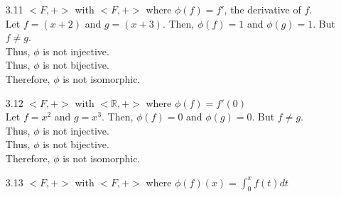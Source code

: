 \documentclass[12pt]{article}
\newcommand{\R}{\mathbb{R}}
\begin{document}
\begin{enumerate}
		\begin{enumerate}
			
			\item[3.11] $<F,+>$ with $<F,+>$ where $\phi(f) = f'$, the derivative of $f$.\\
				Let $ f=(x+2) $ and $ g=(x+3) $. Then, $ \phi(f) = 1 $ and $ \phi(g) = 1 $. But $ f \not = g $. \\
				Thus, $ \phi $ is not injective. \\
				Thus, $ \phi $ is not bijective. \\
				Therefore, $ \phi $ is not isomorphic.
				
			\item[3.12] $<F,+>$ with $<\R,+>$ where $\phi(f) = f'(0)$\\
				Let $ f=x^2 $ and $ g=x^3 $. Then, $ \phi(f) = 0 $ and $ \phi(g) = 0 $. But $ f \not = g $. \\
				Thus, $ \phi $ is not injective. \\
				Thus, $ \phi $ is not bijective. \\
				Therefore, $ \phi $ is not isomorphic.
				
			\item[3.13] $<F,+>$ with $<F,+>$ where $\phi(f)(x) = \int_0^xf(t)dt $ 
			

\end{enumerate}
\end{enumerate}
\end{document}

